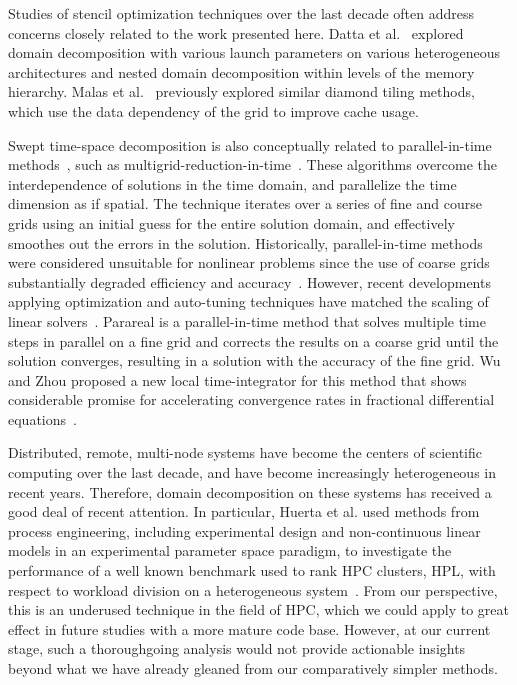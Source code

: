 Studies of stencil optimization techniques over the last decade often address concerns closely related to the work presented here.
Datta et al.~\cite{VolkovDatta2008} explored domain decomposition with various launch parameters on various heterogeneous architectures and nested domain decomposition within levels of the memory hierarchy.
Malas et al.~\cite{MalasHager} previously explored similar diamond tiling methods, which use the data dependency of the grid to improve cache usage.

Swept time-space decomposition is also conceptually related to parallel-in-time methods~\cite{Gander2015},
such as multigrid-reduction-in-time~\cite{falgout2014parallel}.
These algorithms overcome the interdependence of solutions in the time domain, and parallelize the time dimension as if spatial.
The technique iterates over a series of fine and course grids using an initial guess for the entire solution domain, and effectively smoothes out the errors in the solution.
Historically, parallel-in-time methods were considered unsuitable for nonlinear problems since the use of coarse grids substantially degraded efficiency and accuracy~\cite{alhubail:16jcp}.
However, recent developments applying optimization and auto-tuning techniques have matched the scaling of linear solvers~\cite{MGRITImprove}.
Parareal is a parallel-in-time method that solves multiple time steps in parallel on a fine grid
and corrects the results on a coarse grid until the solution converges, resulting in a solution with the accuracy of the fine grid.
Wu and Zhou proposed a new local time-integrator for this method that shows considerable promise
for accelerating convergence rates in fractional differential equations~\cite{PararealWu}.

Distributed, remote, multi-node systems have become the centers of scientific computing
over the last decade, and have become increasingly heterogeneous in recent years.
Therefore, domain decomposition on these systems has received a good deal of recent attention.
In particular, Huerta et al. used methods from process engineering, including experimental design
and non-continuous linear models in an experimental parameter space paradigm, to investigate
the performance of a well known benchmark used to rank HPC clusters, HPL, with respect to workload division
on a heterogeneous system~\cite{DOEbenchmarks}.
From our perspective, this is an underused technique in the field of HPC, which
we could apply to great effect in future studies with a more mature code base.
However, at our current stage, such a thoroughgoing analysis would not provide actionable
insights beyond what we have already gleaned from our comparatively simpler methods.
